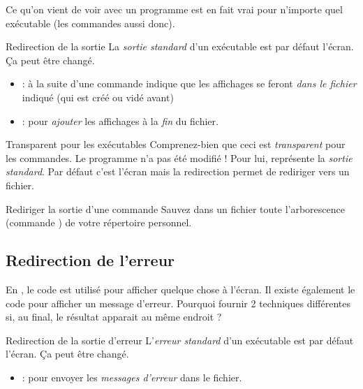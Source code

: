 \documentclass[a4paper,11pt]{style-esi/td}
\begin{document}
		Ce qu'on vient de voir avec un programme  est en fait
		vrai pour n'importe quel exécutable (les commandes aussi donc).

		\begin{theorie}{Redirection de la sortie}
			La \emph{sortie standard} d'un exécutable est par défaut l'écran.
			\c Ca peut être changé. 
			\begin{itemize}
				\item {} :
					à la suite d'une commande indique que les affichages
					se feront \emph{dans le fichier} indiqué (qui est créé ou vidé avant)
				\item {} : 
					pour \emph{ajouter} les affichages à la \emph{fin} du fichier.
			\end{itemize}
		\end{theorie}

		\begin{alerttbox}{Transparent pour les exécutables}
			Comprenez-bien que ceci est \emph{transparent}
			pour les commandes.
			Le programme  n'a pas été modifié !
			Pour lui,  représente la \emph{sortie standard}.
			Par défaut c'est l'écran mais la redirection 
			permet de rediriger vers un fichier.
		\end{alerttbox}

		\begin{Exercice}{Rediriger la sortie d'une commande}
			Sauvez dans un fichier toute l'arborescence (commande )
			de votre répertoire per\-son\-nel.
		\end{Exercice}

	\subsection{Redirection de l'erreur}
	
		En , le code 
		est utilisé pour afficher quelque chose à l'écran.
		Il existe également le code 
		pour afficher un message d'erreur.
		Pourquoi fournir 2 techniques différentes si, au final,
		le résultat apparait au même endroit ?

		\begin{theorie}{Redirection de la sortie d'erreur}
			L'\emph{erreur standard} d'un exécutable est par défaut l'écran.
			\c Ca peut être changé. 
			\begin{itemize}
				\item {} : 
				pour envoyer les \emph{messages d'erreur} dans le fichier.
			\end{itemize}
		\end{theorie}
\end{document}
